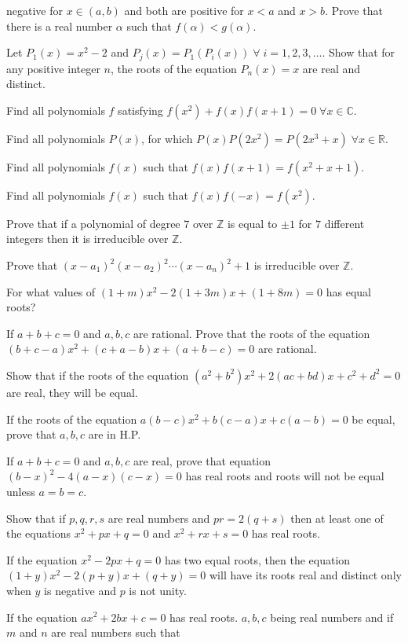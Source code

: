   negative for $x\in(a, b)$ and both are positive for $x < a$ and $x > b$. Prove that there is a real number
  $\alpha$ such that $f(\alpha) < g(\alpha)$.
\item Let $P_1(x) = x^2 - 2$ and $P_j(x) = P_1(P_i(x))\;\forall\;i = 1, 2, 3, \ldots$. Show that for any
  positive integer $n$, the roots of the equation $P_n(x) = x$ are real and distinct.
\item Find all polynomials $f$ satisfying $f(x^2) + f(x)f(x + 1) = 0\;\forall x\in\mathbb{C}$.
\item Find all polynomials $P(x)$, for which $P(x)P(2x^2) = P(2x^3 + x)\;\forall x \in\mathbb{R}$.
\item Find all polynomials $f(x)$ such that $f(x)f(x + 1) = f(x^2 + x + 1)$.
\item Find all polynomials $f(x)$ such that $f(x)f(-x) = f(x^2)$.
\item Prove that if a polynomial of degree $7$ over $\mathbb{Z}$ is equal to $\pm1$ for $7$ different
  integers then it is irreducible over $\mathbb{Z}$.
\item Prove that $(x - a_1)^2(x - a_2)^2\cdots(x - a_n)^2 + 1$ is irreducible over $\mathbb{Z}$.
\item For what values of $(1 + m)x^2 - 2(1 + 3m)x + (1 + 8m) = 0$ has equal roots?
\item If $a + b + c = 0$ and $a,b,c$ are rational. Prove that the roots of the equation $(b + c - a)x^2 + (c + a - b)x + (a + b -
  c) = 0$ are rational.
\item Show that if the roots of the equation $(a^2 + b^2)x^2 + 2(ac + bd)x + c^2 + d^2 = 0$ are real, they will be equal.
\item If the roots of the equation $a(b - c)x^2 + b(c - a)x + c(a - b) = 0$ be equal, prove that $a, b, c$ are in H.P.
\item If $a + b + c = 0$ and $a,b,c$ are real, prove that equation $(b - x)^2 - 4(a - x)(c - x) = 0$ has real roots and roots will
  not be equal unless $a=b=c$.
\item Show that if $p,q,r,s$ are real numbers and $pr = 2(q + s)$ then at least one of the equations $x^2 + px + q = 0$ and $x^2 +
  rx + s = 0$ has real roots.
\item If the equation $x^2 - 2px + q = 0$ has two equal roots, then the equation $(1 + y)x^2 - 2(p + y)x + (q + y) = 0$ will have
  its roots real and distinct only when $y$ is negative and $p$ is not unity.
\item If the equation $ax^2 + 2bx + c = 0$ has real roots. $a,b,c$ being real numbers and if $m$ and $n$ are real numbers such that
